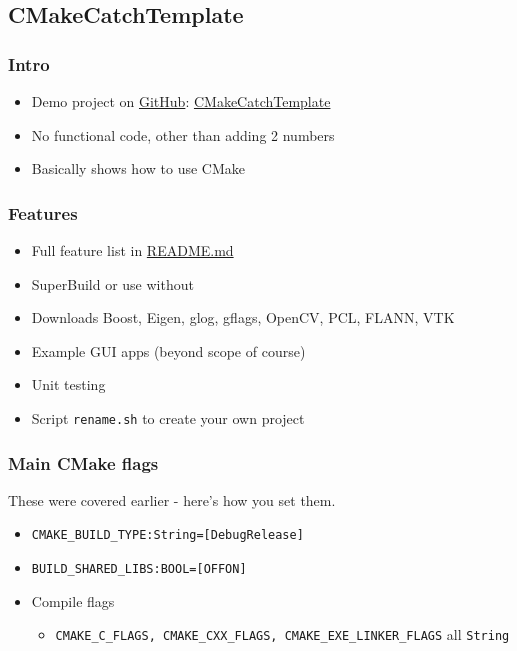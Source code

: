 \subsection{CMakeCatchTemplate}\label{cmakecatchtemplate}

\subsubsection{Intro}\label{intro}

\begin{itemize}
\itemsep1pt\parskip0pt
\item
  Demo project on \href{https://github.com}{GitHub}:
  \href{https://github.com/MattClarkson/CMakeCatchTemplate}{CMakeCatchTemplate}
\item
  No functional code, other than adding 2 numbers
\item
  Basically shows how to use CMake
\end{itemize}

\subsubsection{Features}\label{features}

\begin{itemize}
\itemsep1pt\parskip0pt
\item
  Full feature list in
  \href{https://github.com/MattClarkson/CMakeCatchTemplate/blob/master/README.md}{README.md}
\item
  SuperBuild or use without
\item
  Downloads Boost, Eigen, glog, gflags, OpenCV, PCL, FLANN, VTK
\item
  Example GUI apps (beyond scope of course)
\item
  Unit testing
\item
  Script \texttt{rename.sh} to create your own project
\end{itemize}

\subsubsection{Main CMake flags}\label{main-cmake-flags}

These were covered earlier - here's how you set them.

\begin{itemize}
\itemsep1pt\parskip0pt
\item
  \texttt{CMAKE\_BUILD\_TYPE:String={[}Debug\textbar{}Release{]}}
\item
  \texttt{BUILD\_SHARED\_LIBS:BOOL={[}OFF\textbar{}ON{]}}
\item
  Compile flags

  \begin{itemize}
  \itemsep1pt\parskip0pt
  \item
    \texttt{CMAKE\_C\_FLAGS, CMAKE\_CXX\_FLAGS, CMAKE\_EXE\_LINKER\_FLAGS}
    all \texttt{String}
  \end{itemize}
\end{itemize}

